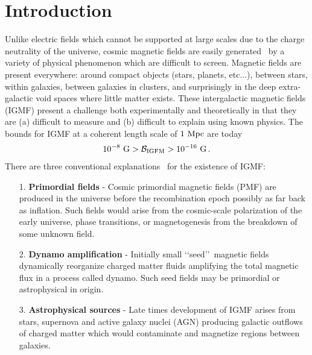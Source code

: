 \documentclass[a4paper]{article}
\begin{document}
\section{Introduction}\label{sec:Introduction}
\noindent Unlike electric fields which cannot be supported at large scales due to the charge neutrality of the universe, cosmic magnetic fields are easily generated~\cite{kronberg1994extragalactic,gaensler2004origin,durrer2013cosmological} by a variety of physical phenomenon which are difficult to screen. Magnetic fields are present everywhere: around compact objects (stars, planets, etc...), between stars, within galaxies, between galaxies in clusters, and surprisingly in the deep extra-galactic void spaces where little matter exists. These intergalactic magnetic fields (IGMF) present a challenge both experimentally and theoretically in that they are (a) difficult to measure and (b) difficult to explain using known physics. The bounds for IGMF at a coherent length scale of $1{\rm\ Mpc}$ are today~\cite{neronov2010evidence,taylor2011extragalactic,pshirkov2015new,vernstrom2021discovery}
\begin{align}
    \label{igmf}
    10^{-8}{\rm\ G}>\mathcal{B}_{\rm IGFM}>10^{-16}{\rm\ G}\,.
\end{align}
There are three conventional explanations~\cite{batista2021gammaray} for the existence of IGMF:
\begin{itemize}
    \item [1.] \textbf{Primordial fields} - Cosmic primordial magnetic fields (PMF) are produced in the universe before the recombination epoch possibly as far back as inflation. Such fields would arise from the cosmic-scale polarization of the early universe, phase transitions, or magnetogenesis from the breakdown of some unknown field.
    \item [2.] \textbf{Dynamo amplification} - Initially small \lq\lq seed\rq\rq\ magnetic fields dynamically reorganize charged matter fluids amplifying the total magnetic flux in a process called dynamo. Such seed fields may be primordial or astrophysical in origin.
    \item [3.] \textbf{Astrophysical sources} - Late times development of IGMF arises from stars, supernova and active galaxy nuclei (AGN) producing galactic outflows of charged matter which would contaminate and magnetize regions between galaxies.
\end{itemize}
\end{document}
